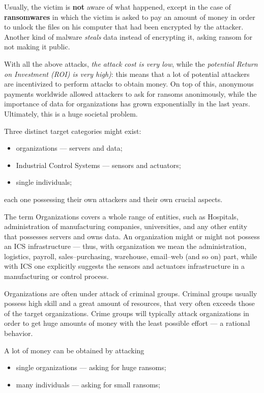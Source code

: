 \documentclass[10pt]{extreport}
\begin{document}
Usually, the victim is \textbf{not} aware of what happened, except in the case
of \textbf{ransomwares} in which the victim is asked to pay an amount of money
in order to unlock the files on his computer that had been encrypted by the
attacker. Another kind of malware \emph{steals} data instead of encrypting it,
asking ransom for not making it public.

With all the above attacks, \emph{the attack cost is very low}, while the
\emph{potential Return on Investment (ROI) is very high)}: this means that a
lot of potential attackers are incentivized to perform attacks to obtain money.
On top of this, anonymous payments worldwide allowed attackers to ask for
ransoms anonimously, while the importance of data for organizations has grown
exponentially in the last years. Ultimately, this is a huge societal problem.

Three distinct target categories might exist:
\begin{itemize}
    \item organizations --- servers and data;
    \item Industrial Control Systems --- sensors and actuators;
    \item single individuals;
\end{itemize}

each one possessing their own attackers and their own crucial aspects.

The term Organizations covers a whole range of entities, such as Hospitals,
administration of manufacturing companies, universities, and any other entity
that possesses servers and owns data. An organization might or might not
possess an ICS infrastructure --- thus, with organization we mean the
administration, logistics, payroll, sales\---purchasing, warehouse,
email\---web (and so on) part, while with ICS one explicitly suggests the
sensors and actuators infrastructure in a manufacturing or control process.

Organizations are often under attack of criminal groups. Criminal groups
usually possess high skill and a great amount of resources, that very often
exceeds those of the target organizations. Crime groups will typically attack
organizations in order to get huge amounts of money with the least possible
effort --- a rational behavior.

A lot of money can be obtained by attacking
\begin{itemize}
    \item single organizations --- asking for huge ransoms;
    \item many individuals --- asking for small ransoms;
\end{itemize}
\end{document}
